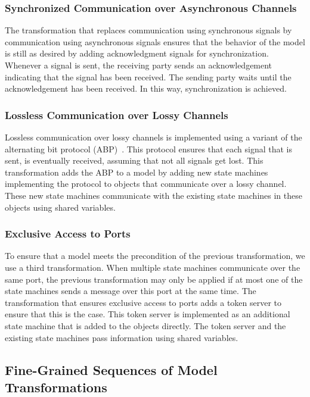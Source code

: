 \subsubsection{Synchronized Communication over Asynchronous Channels}
The transformation that replaces communication using synchronous signals by communication using asynchronous signals ensures that the behavior of the model is still as desired by adding acknowledgment signals for synchronization.
Whenever a signal is sent, the receiving party sends an acknowledgement indicating that the signal has been received.
The sending party waits until the acknowledgement has been received.
In this way, synchronization is achieved.

\subsubsection{Lossless Communication over Lossy Channels}
Lossless communication over lossy channels is implemented using a variant of the alternating bit protocol (ABP)~\cite{Baeten2002,Bartlett1969}.
This protocol ensures that each signal that is sent, is eventually received, assuming that not all signals get lost.
This transformation adds the ABP to a model by adding new state machines implementing the protocol to objects that communicate over a lossy channel.
These new state machines communicate with the existing state machines in these objects using shared variables.

\subsubsection{Exclusive Access to Ports}
To ensure that a model meets the precondition of the previous transformation, we use a third transformation.
When multiple state machines communicate over the same port, the previous transformation may only be applied if at most one of the state machines sends a message over this port at the same time.
The transformation that ensures exclusive access to ports adds a token server to ensure that this is the case.
This token server is implemented as an additional state machine that is added to the objects directly.
The token server and the existing state machines pass information using shared variables.

\subsection{Fine-Grained Sequences of Model Transformations}
\label{subsec:exploring-boundaries:fg_model_transformations}

